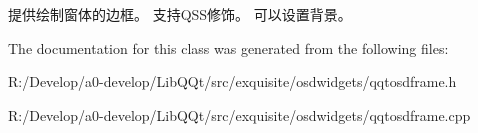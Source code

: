 提供绘制窗体的边框。 支持\+Q\+S\+S修饰。 可以设置背景。 

The documentation for this class was generated from the following files\+:\begin{DoxyCompactItemize}
\item 
R\+:/\+Develop/a0-\/develop/\+Lib\+Q\+Qt/src/exquisite/osdwidgets/qqtosdframe.\+h\item 
R\+:/\+Develop/a0-\/develop/\+Lib\+Q\+Qt/src/exquisite/osdwidgets/qqtosdframe.\+cpp\end{DoxyCompactItemize}
